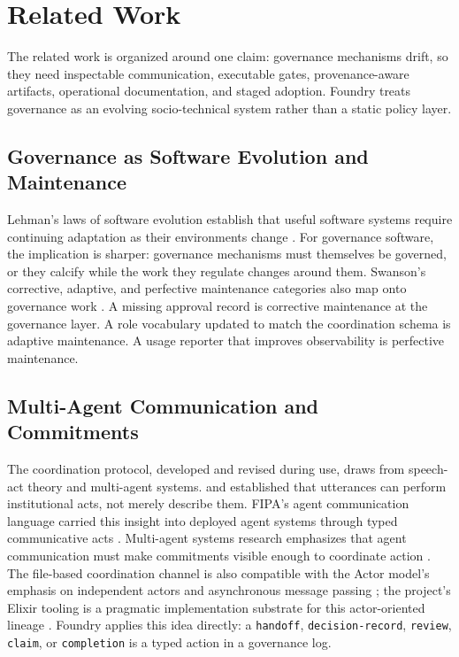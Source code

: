 \documentclass[conference]{IEEEtran}
\begin{document}
\section{Related Work}

The related work is organized around one claim: governance mechanisms drift, so they need inspectable communication, executable gates, provenance-aware artifacts, operational documentation, and staged adoption. Foundry treats governance as an evolving socio-technical system rather than a static policy layer.

\subsection{Governance as Software Evolution and Maintenance}

Lehman's laws of software evolution establish that useful software systems require continuing adaptation as their environments change \cite{lehman1980laws}. For governance software, the implication is sharper: governance mechanisms must themselves be governed, or they calcify while the work they regulate changes around them. Swanson's corrective, adaptive, and perfective maintenance categories also map onto governance work \cite{swanson1976maintenance}. A missing approval record is corrective maintenance at the governance layer. A role vocabulary updated to match the coordination schema is adaptive maintenance. A usage reporter that improves observability is perfective maintenance.

\subsection{Multi-Agent Communication and Commitments}

The coordination protocol, developed and revised during use, draws from speech-act theory and multi-agent systems. \cite{austin1962words} and \cite{searle1969speech} established that utterances can perform institutional acts, not merely describe them. FIPA's agent communication language carried this insight into deployed agent systems through typed communicative acts \cite{fipa2002communicative}. Multi-agent systems research emphasizes that agent communication must make commitments visible enough to coordinate action \cite{wooldridge2009introduction,shoham2009multiagent}. The file-based coordination channel is also compatible with the Actor model's emphasis on independent actors and asynchronous message passing \cite{hewitt1973actor,agha1986actors}; the project's Elixir tooling is a pragmatic implementation substrate for this actor-oriented lineage \cite{armstrong2007programming}. Foundry applies this idea directly: a \texttt{handoff}, \texttt{decision-record}, \texttt{review}, \texttt{claim}, or \texttt{completion} is a typed action in a governance log.
\end{document}
